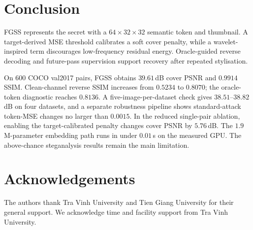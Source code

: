 \documentclass[runningheads]{llncs}
\begin{document}
\section{Conclusion}
FGSS represents the secret with a $64\!\times\!32\!\times\!32$ semantic token and thumbnail. A target-derived MSE threshold calibrates a soft cover penalty, while a wavelet-inspired term discourages low-frequency residual energy. Oracle-guided reverse decoding and future-pass supervision support recovery after repeated stylisation.

On $600$ COCO val2017 pairs, FGSS obtains $39.61$\,dB cover PSNR and $0.9914$ SSIM. Clean-channel reverse SSIM increases from $0.5234$ to $0.8070$; the oracle-token diagnostic reaches $0.8136$. A five-image-per-dataset check gives $38.51$--$38.82$\,dB on four datasets, and a separate robustness pipeline shows standard-attack token-MSE changes no larger than $0.0015$. In the reduced single-pair ablation, enabling the target-calibrated penalty changes cover PSNR by $5.76$\,dB. The $1.9$\,M-parameter embedding path runs in under $0.01$\,s on the measured GPU. The above-chance steganalysis results remain the main limitation.

\section*{Acknowledgements}
The authors thank Tra Vinh University and Tien Giang University for their general support. We acknowledge time and facility support from Tra Vinh University.
\end{document}

